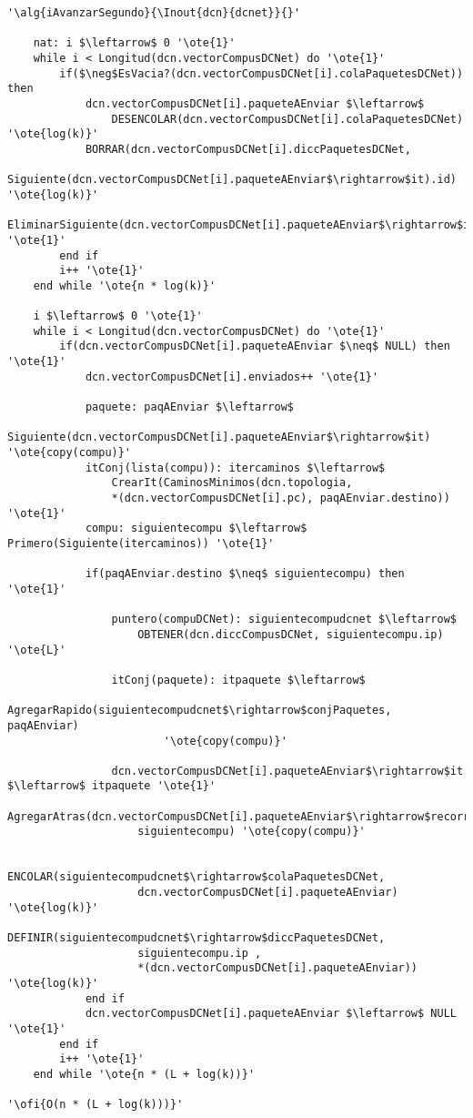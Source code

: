 \begin{lstlisting}[mathescape]
'\alg{iAvanzarSegundo}{\Inout{dcn}{dcnet}}{}'

	nat: i $\leftarrow$ 0 '\ote{1}'
	while i < Longitud(dcn.vectorCompusDCNet) do '\ote{1}'
		if($\neg$EsVacia?(dcn.vectorCompusDCNet[i].colaPaquetesDCNet)) then
			dcn.vectorCompusDCNet[i].paqueteAEnviar $\leftarrow$ 
				DESENCOLAR(dcn.vectorCompusDCNet[i].colaPaquetesDCNet) '\ote{log(k)}'
			BORRAR(dcn.vectorCompusDCNet[i].diccPaquetesDCNet,
				Siguiente(dcn.vectorCompusDCNet[i].paqueteAEnviar$\rightarrow$it).id) '\ote{log(k)}'
			EliminarSiguiente(dcn.vectorCompusDCNet[i].paqueteAEnviar$\rightarrow$it) '\ote{1}'
		end if
		i++ '\ote{1}'
	end while '\ote{n * log(k)}'

	i $\leftarrow$ 0 '\ote{1}'
	while i < Longitud(dcn.vectorCompusDCNet) do '\ote{1}'
		if(dcn.vectorCompusDCNet[i].paqueteAEnviar $\neq$ NULL) then '\ote{1}'
			dcn.vectorCompusDCNet[i].enviados++ '\ote{1}'

			paquete: paqAEnviar $\leftarrow$ 
				Siguiente(dcn.vectorCompusDCNet[i].paqueteAEnviar$\rightarrow$it) '\ote{copy(compu)}'
			itConj(lista(compu)): itercaminos $\leftarrow$ 
				CrearIt(CaminosMinimos(dcn.topologia, 
				*(dcn.vectorCompusDCNet[i].pc), paqAEnviar.destino)) '\ote{1}'
			compu: siguientecompu $\leftarrow$ Primero(Siguiente(itercaminos)) '\ote{1}'

			if(paqAEnviar.destino $\neq$ siguientecompu) then '\ote{1}'

				puntero(compuDCNet): siguientecompudcnet $\leftarrow$ 
					OBTENER(dcn.diccCompusDCNet, siguientecompu.ip) '\ote{L}'
				
				itConj(paquete): itpaquete $\leftarrow$ 
					AgregarRapido(siguientecompudcnet$\rightarrow$conjPaquetes, paqAEnviar) 
						'\ote{copy(compu)}'
				
				dcn.vectorCompusDCNet[i].paqueteAEnviar$\rightarrow$it $\leftarrow$ itpaquete '\ote{1}'
				AgregarAtras(dcn.vectorCompusDCNet[i].paqueteAEnviar$\rightarrow$recorrido, 
					siguientecompu) '\ote{copy(compu)}'

				ENCOLAR(siguientecompudcnet$\rightarrow$colaPaquetesDCNet, 
					dcn.vectorCompusDCNet[i].paqueteAEnviar) '\ote{log(k)}'
				DEFINIR(siguientecompudcnet$\rightarrow$diccPaquetesDCNet, 
					siguientecompu.ip ,
					*(dcn.vectorCompusDCNet[i].paqueteAEnviar)) '\ote{log(k)}'
			end if
			dcn.vectorCompusDCNet[i].paqueteAEnviar $\leftarrow$ NULL '\ote{1}'
		end if
		i++ '\ote{1}'
	end while '\ote{n * (L + log(k))}'	

'\ofi{O(n * (L + log(k)))}'
\end{lstlisting}


